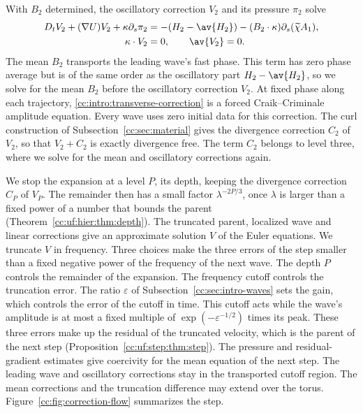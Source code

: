 With $B_2$ determined, the oscillatory correction $V_2$ and its pressure
$\pi_2$ solve
\begin{equation}\label{cc:intro:transverse-correction}
 \begin{split}
 D_tV_2+(\nabla U)V_2+\kappa\partial_s\pi_2
   &=-(H_2-\av{H_2})-(B_2\cdot\kappa)\partial_s(\widetilde\chi A_1),\\
 \kappa\cdot V_2&=0,\qquad \av{V_2}=0.
 \end{split}
\end{equation}
The mean $B_2$ transports the leading wave's fast phase. This term has
zero phase average but is of the same order as the oscillatory part
$H_2-\av{H_2}$, so we solve for the mean $B_2$ before the oscillatory
correction $V_2$. At fixed phase along each trajectory,
\eqref{cc:intro:transverse-correction} is a forced Craik--Criminale
amplitude equation. Every wave uses
zero initial data for this correction. The curl construction of
Subsection~\ref{cc:sec:material} gives the divergence correction $C_2$
of $V_2$, so that $V_2+C_2$ is exactly divergence free. The term $C_2$
belongs to level three, where we solve for the mean and oscillatory
corrections again.

We stop the expansion at a level $P$, its depth, keeping the divergence
correction $C_P$ of $V_P$. The remainder then has a small factor
$\lambda^{-2P/3}$, once $\lambda$ is larger
than a fixed power of a number that bounds the parent
(Theorem~\ref{cc:uf:hier:thm:depth}). The truncated parent, localized wave
and linear corrections give an approximate solution $V$ of the Euler
equations. We truncate $V$ in frequency. Three choices make the three
errors of the step smaller than a fixed negative power of the frequency
of the next wave. The depth $P$ controls the remainder of the
expansion. The frequency cutoff controls the truncation error. The
ratio $\varepsilon$ of Subsection~\ref{cc:sec:intro-waves} sets the
gain, which controls the error of the cutoff in time. This cutoff acts
while the wave's amplitude is at most a fixed multiple of
$\exp(-\varepsilon^{-1/2})$ times its peak. These three errors make up
the residual of the truncated velocity, which is the parent of the next step
(Proposition~\ref{cc:uf:step:thm:step}).
The pressure and residual-gradient estimates give coercivity for
the mean equation of the next step. The leading wave and oscillatory
corrections stay in the transported cutoff region. The mean corrections
and the truncation difference may extend over the torus. Figure~\ref{cc:fig:correction-flow} summarizes the step.


